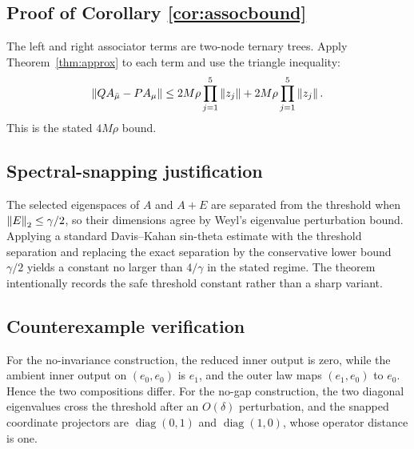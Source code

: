 \subsection{Proof of Corollary \ref{cor:assocbound}}

The left and right associator terms are two-node ternary trees. Apply
Theorem~\ref{thm:approx} to each term and use the triangle inequality:
\[
\left\lVert QA_{\bar\mu}-PA_\mu\right\rVert
\leq 2M\rho\prod_{j=1}^5\left\lVert z_j\right\rVert
+2M\rho\prod_{j=1}^5\left\lVert z_j\right\rVert.
\]
This is the stated \(4M\rho\) bound.

\subsection{Spectral-snapping justification}

The selected eigenspaces of \(A\) and \(A+E\) are separated from the
threshold when \(\left\lVert E\right\rVert_2\leq\gamma/2\), so their dimensions agree by
Weyl's eigenvalue perturbation bound. Applying a standard Davis--Kahan
sin-theta estimate with the threshold separation and replacing the exact
separation by the conservative lower bound \(\gamma/2\) yields a constant no
larger than \(4/\gamma\) in the stated regime. The theorem intentionally
records the safe threshold constant rather than a sharp variant.

\subsection{Counterexample verification}

For the no-invariance construction, the reduced inner output is zero, while
the ambient inner output on \((e_0,e_0)\) is \(e_1\), and the outer law maps
\((e_1,e_0)\) to \(e_0\). Hence the two compositions differ. For the
no-gap construction, the two diagonal eigenvalues cross the threshold after
an \(O(\delta)\) perturbation, and the snapped coordinate projectors are
\(\operatorname{diag}(0,1)\) and \(\operatorname{diag}(1,0)\), whose operator
distance is one.
